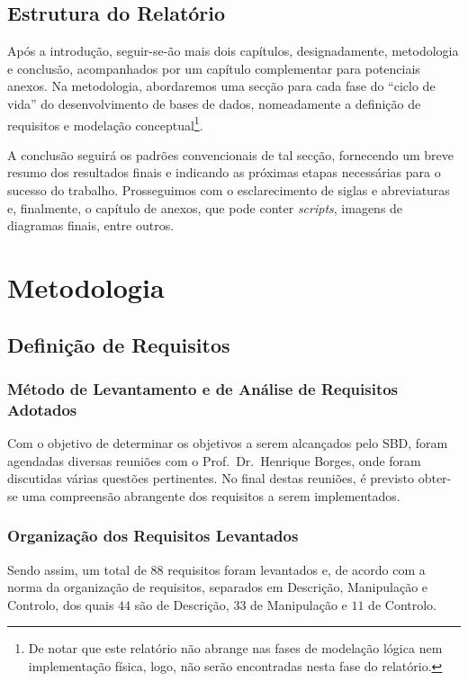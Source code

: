 \documentclass[a4paper,12pt]{scrreprt}
\begin{document}
    \section{Estrutura do Relatório}

    Após a introdução, seguir-se-ão mais dois capítulos, designadamente, metodologia e conclusão,
    acompanhados por um capítulo complementar para potenciais anexos.
    Na metodologia, abordaremos uma secção para cada fase do ``ciclo de vida'' do desenvolvimento de bases de dados,
    nomeadamente a definição de requisitos e modelação conceptual\footnote{De notar que este relat\'orio n\~ao abrange nas fases de modela\c{c}\~ao
        l\'ogica nem implementa\c{c}\~ao f\'isica, logo, n\~ao ser\~ao encontradas nesta fase do relat\'orio.}.
        
    A conclusão seguirá os padrões convencionais de tal secção, fornecendo um breve
    resumo dos resultados finais e indicando as próximas etapas necessárias para o sucesso do trabalho.
    Prosseguimos com o esclarecimento de siglas e abreviaturas e, finalmente, o capítulo de anexos,
    que pode conter \textit{scripts}, imagens de diagramas finais, entre outros.
        
\chapter{Metodologia}
    \section{Defini\c{c}\~ao de Requisitos}
        \subsection{M\'etodo de Levantamento e de An\'alise de Requisitos Adotados}
        Com o objetivo de determinar os objetivos a serem alcançados pelo SBD,
        foram agendadas diversas reuniões com o Prof.\ Dr.\ Henrique Borges, onde foram discutidas
        várias questões pertinentes. No final destas reuniões, é previsto obter-se uma compreensão
        abrangente dos requisitos a serem implementados.
        \subsection{Organiza\c{c}\~ao dos Requisitos Levantados}
        Sendo assim, um total de $88$ requisitos foram levantados e,
        de acordo com a norma da organização de requisitos, separados em Descrição,
        Manipulação e Controlo, dos quais $44$ são de Descrição, $33$ de Manipulação e
        $11$ de Controlo.
        \newpage
\end{document}
